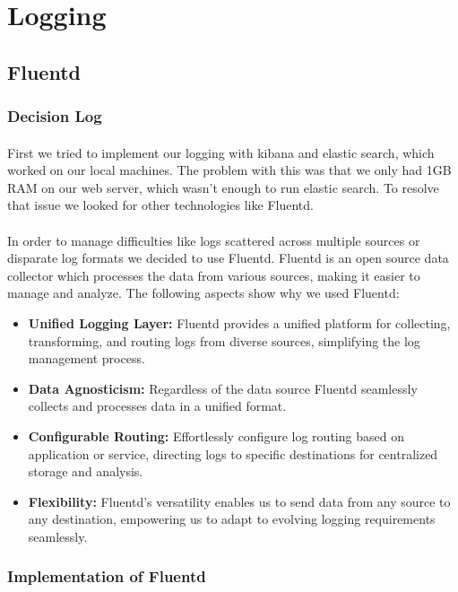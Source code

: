 \section{Logging}
\subsection{Fluentd}
\subsubsection{Decision Log}
\paragraph{} First we tried to implement our logging with kibana and elastic search, which worked on our local machines. The problem with this was that we only had 1GB RAM on our web server,  which wasn't enough to run elastic search. To resolve that issue we looked for other technologies like Fluentd.

\paragraph{} In order to manage difficulties like logs scattered across multiple sources or disparate log formats we decided to use Fluentd. Fluentd is an open source data collector which processes the data from various sources, making it easier to manage and analyze. The following aspects show why we used Fluentd: 
\begin{itemize}
    \item \textbf{Unified Logging Layer:} Fluentd provides a unified platform for collecting, transforming, and routing logs from diverse sources, simplifying the log management process.
    \item \textbf{Data Agnosticism:} Regardless of the data source Fluentd seamlessly collects and processes data in a unified format.
    \item \textbf{Configurable Routing:} Effortlessly configure log routing based on application or service, directing logs to specific destinations for centralized storage and analysis.
    \item \textbf{Flexibility:} Fluentd's versatility enables us to send data from any source to any destination, empowering us to adapt to evolving logging requirements seamlessly.
\end{itemize}

\subsubsection{Implementation of Fluentd}
